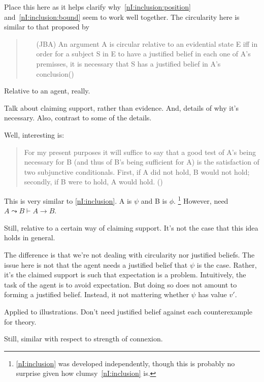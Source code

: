 \begin{note}[Literature]
  {
    \color{red}
    Place this here as it helps clarify why~\ref{nI:inclusion:position} and~\ref{nI:inclusion:bound} seem to work well together.
  }
  The circularity here is similar to that proposed by~\cite{Sgaravatti:2013wu}

  \begin{quote}
    \begin{itemize}
    \item[(JBA)] An argument A is circular relative to an evidential state E iff in order for a subject S in E to have a justified belief in each one of A’s premisses, it is necessary that S has a justified belief in A’s conclusion\nolinebreak \mbox{}\hfill\mbox{(\Citeyear[759]{Sgaravatti:2013wu})}
    \end{itemize}
  \end{quote}
  Relative to an agent, really.

  Talk about claiming support, rather than evidence.
  And, details of why it's necessary.
  Also, contrast to some of the details.

  Well, interesting is:
  \begin{quote}
    For my present purposes it will suffice to say that a good test of A’s being necessary for B (and thus of B’s being sufficient for A) is the satisfaction of two subjunctive conditionals. First, if A did not hold, B would not hold; secondly, if B were to hold, A would hold.\nolinebreak
    \mbox{}\hfill\mbox{(\Citeyear[761]{Sgaravatti:2013wu})}
  \end{quote}
  This is very similar to \ref{nI:inclusion}.
  A is \(\psi\) and B is \(\phi\).\nolinebreak
  \footnote{
    \ref{nI:inclusion} was developed independently, though this is probably no surprise given how clumsy~\ref{nI:inclusion} is.
  }
  However, need \(A \leadsto B \vdash A \rightarrow B\).

  Still, relative to a certain way of claiming support.
  It's not the case that this idea holds in general.

  The difference is that we're not dealing with circularity nor justified beliefs.
  The issue here is not that the agent needs a justified belief that \(\psi\) is the case.
  Rather, it's the claimed support is such that expectation is a problem.
  Intuitively, the task of the agent is to avoid expectation.
  But doing so does not amount to forming a justified belief.
  Instead, it not mattering whether \(\psi\) has value \(v'\).

  Applied to illustrations.
  Don't need justified belief against each counterexample for theory.

  Still, similar with respect to strength of connexion.
\end{note}

